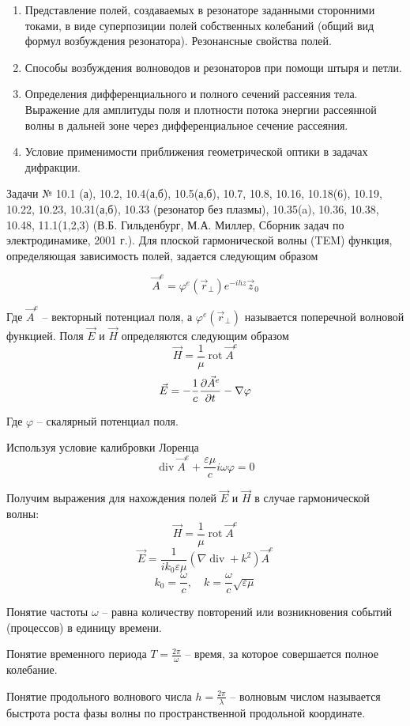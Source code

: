 \documentclass[a4paper,14pt]{extarticle}
\DeclareMathOperator{\Div}{div}
\DeclareMathOperator{\Rot}{rot}
\renewcommand{\phi}{\varphi}
\renewcommand{\epsilon}{\varepsilon}
\begin{document}
\begin{enumerate}
		\item 
		Представление полей, создаваемых в резонаторе заданными сторонними токами, в виде суперпозиции полей собственных колебаний (общий вид формул возбуждения резонатора). Резонансные свойства полей.
		\item 
		Способы возбуждения волноводов и резонаторов при помощи штыря и петли.
		\item 
		Определения дифференциального и полного сечений рассеяния тела. Выражение для амплитуды поля и плотности потока энергии рассеянной волны в дальней зоне через дифференциальное сечение рассеяния.
		\item 
		Условие применимости приближения геометрической оптики в задачах дифракции.
		
	\end{enumerate}
	
	Задачи № 10.1 (а), 10.2, 10.4(а,б), 10.5(а,б), 10.7, 10.8, 10.16, 10.18(6), 10.19, 10.22, 10.23, 10.31(а,б), 10.33 (резонатор без плазмы), 10.35(a), 10.36, 10.38, 10.48, 11.1(1,2,3)
	(В.Б. Гильденбург, М.А. Миллер, Сборник задач по электродинамике, 2001 г.).
	\newpage
	\hypertarget{num1}{}
	Для плоской гармонической волны (TEM) функция, определяющая зависимость полей, задается следующим образом 
	
	$$\vec{A}^e = \phi^e(\vec{r}_\perp)e^{-ihz}\vec{z}_0$$
	
	Где $\vec{A}^e$ -- векторный потенциал поля, а $\phi^e(\vec{r}_\perp)$ называется поперечной волновой функцией. Поля $\vec{E}$ и $\vec{H}$ определяются следующим образом
	$$\vec{H}=\frac{1}{\mu} \Rot\vec{A}^e $$
	$$\vec{E}=-\frac{1}{c} \pdv{\vec{A}^e}{t}-\nabla{\phi} $$
	
	Где $\phi$ -- скалярный потенциал поля. 
	
	Используя условие калибровки Лоренца
	$$\Div\vec{A}^e+\frac{\epsilon\mu}{c}i\omega\phi=0$$
	
	Получим выражения для нахождения полей $\vec{E}$ и $\vec{H}$ в случае гармонической волны:
	$$\vec{H}=\frac{1}{\mu} \Rot\vec{A}^e $$
	$$\vec{E}=\frac{1}{i k_0\epsilon\mu}(\nabla \Div + k^2)\vec{A}^e $$
	$$k_0=\frac{\omega}{c}, \quad k=\frac{\omega}{c}\sqrt{\epsilon\mu}$$
	
	Понятие частоты $\omega$ -- равна количеству повторений или возникновения событий (процессов) в единицу времени.
	
	Понятие временного периода $T = \frac{2\pi}{\omega}$ -- время, за которое совершается полное колебание.
	
	Понятие продольного волнового числа $h=\frac{2\pi}{\lambda}$ -- волновым числом  называется быстрота роста фазы волны по пространственной продольной координате.
	
\end{document}
